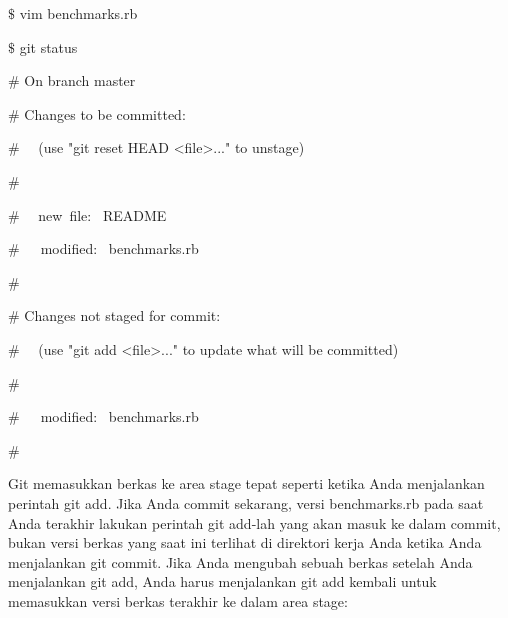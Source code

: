 \vspace{14pt}
\noindent 
{\fontsize{14pt}{14pt}\selectfont  $  \$  $ vim benchmarks.rb \\} \par
\noindent 
{\fontsize{14pt}{14pt}\selectfont  $  \$  $ git status \\} \par
\noindent 
{\fontsize{14pt}{14pt}\selectfont  $  \#  $ On branch master \\} \par
\noindent 
{\fontsize{14pt}{14pt}\selectfont  $  \#  $ Changes to be committed: \\} \par
\noindent 
{\fontsize{14pt}{14pt}\selectfont  $  \#  $~~ (use "git reset HEAD <file>..." to unstage) \\} \par
\noindent 
{\fontsize{14pt}{14pt}\selectfont  $  \#  $ \\} \par
\noindent 
{\fontsize{14pt}{14pt}\selectfont  $  \#  $~~ new~file:~  README \\} \par
\noindent 
{\fontsize{14pt}{14pt}\selectfont  $  \#  $~~~modified:~  benchmarks.rb \\} \par
\noindent 
{\fontsize{14pt}{14pt}\selectfont  $  \#  $ \\} \par
\noindent 
{\fontsize{14pt}{14pt}\selectfont  $  \#  $ Changes not staged for commit: \\} \par
\noindent 
{\fontsize{14pt}{14pt}\selectfont  $  \#  $~~ (use "git add <file>..." to update what will be committed) \\} \par
\noindent 
{\fontsize{14pt}{14pt}\selectfont  $  \#  $ \\} \par
\noindent 
{\fontsize{14pt}{14pt}\selectfont  $  \#  $~~~modified:~  benchmarks.rb \\} \par
\noindent 
{\fontsize{14pt}{14pt}\selectfont  $  \#  $ \\} \par
\vspace{14pt}
\noindent 
{\fontsize{14pt}{14pt}\selectfont Git memasukkan berkas ke area stage tepat seperti ketika Anda menjalankan perintah $  $git add. Jika Anda commit sekarang, versi benchmarks.rb pada saat Anda terakhir lakukan perintah $  $git add-lah yang akan masuk ke dalam commit, bukan versi berkas yang saat ini terlihat di direktori kerja Anda ketika Anda menjalankan $  $git commit. Jika Anda mengubah sebuah berkas setelah Anda menjalankan $  $git add, Anda harus menjalankan $  $git add $  $kembali untuk memasukkan versi berkas terakhir ke dalam area stage: \\} \par
